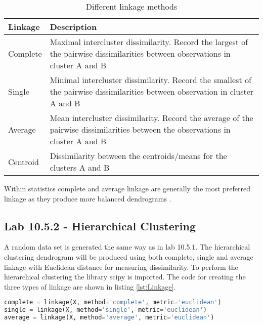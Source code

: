 \begin{table}
	\begin{center}
		\begin{tabular}{ | l | p{12cm} |}
			\hline
			Linkage & Description \\ \hline
			Complete & Maximal intercluster dissimilarity. Record the largest of the pairwise dissimilarities between observations in cluster A and B \\ \hline
			Single & Minimal intercluster dissimilarity. Record the smallest of the pairwise dissimilarities between observation in cluster A and B \\ \hline
			Average & Mean intercluster dissimilarity. Record the average of the pairwise dissimilarities between the observations in cluster A and B\\
			\hline
			Centroid & Dissimilarity between the centroids/means for the clusters A and B
			\\
			\hline
		\end{tabular}
	\end{center}
	\caption{Different linkage methods}
	\label{table:linkage}
\end{table}


Within statistics complete and average linkage are generally the most preferred linkage as they produce more balanced dendrograms \citep[pp. 394-395]{ISLR}. 


\subsection{Lab 10.5.2 - Hierarchical Clustering}
A random data set is generated the same way as in lab 10.5.1.
The hierarchical clustering dendrogram will be produced using both complete, single and average linkage with Euclidean distance for measuring dissimilarity.
To perform the hierarchical clustering the library scipy is imported.
The code for creating the three types of linkage are shown in listing \ref{lst:Linkage}.

\begin{lstlisting}[language=Python, label=lst:Linkage, caption=The code that applies the three different linkage on the data set]
complete = linkage(X, method='complete', metric='euclidean')
single = linkage(X, method='single', metric='euclidean') 
average = linkage(X, method='average', metric='euclidean')
\end{lstlisting}

